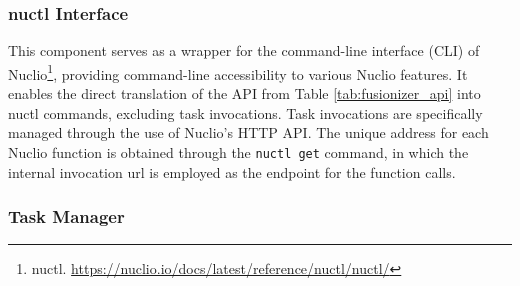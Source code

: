\begin{table}
    \centering
    \caption{Fusionizer HTTP API}
    \label{tab:fusionizer_api}
\end{table}

\subsubsection{nuctl Interface}


This component serves as a wrapper for the command-line interface (CLI) of
Nuclio\footnote{nuctl.
\url{https://nuclio.io/docs/latest/reference/nuctl/nuctl/}}, providing
command-line accessibility to various Nuclio features. It enables the direct
translation of the API from Table \ref{tab:fusionizer_api} into nuctl commands,
excluding task invocations. Task invocations are specifically managed through
the use of Nuclio's HTTP API. The unique address for each Nuclio function is
obtained through the \texttt{nuctl get} command, in which the internal
invocation url is employed as the endpoint for the function calls.

\subsubsection{Task Manager}

